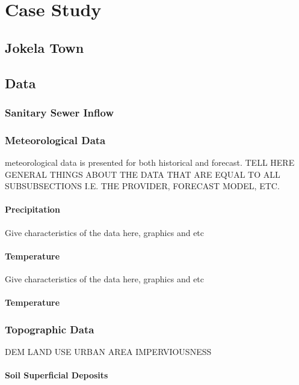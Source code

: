 
\chapter{Case Study}

\section{Jokela Town}

\section{Data}


    \subsection{Sanitary Sewer Inflow} \label{flowdata}
    
    \subsection{Meteorological Data}
    meteorological data is presented for both historical and forecast. 
    TELL HERE GENERAL THINGS ABOUT THE DATA THAT ARE EQUAL TO ALL SUBSUBSECTIONS I.E. THE PROVIDER, FORECAST MODEL, ETC.
        \subsubsection{Precipitation}
        Give characteristics of the data here, graphics and etc
        \subsubsection{Temperature}
        Give characteristics of the data here, graphics and etc
        \subsubsection{Temperature}

        
    \subsection{Topographic Data}
    DEM
    LAND USE
    URBAN AREA
    IMPERVIOUSNESS
    \subsubsection{Soil Superficial Deposits}
    
